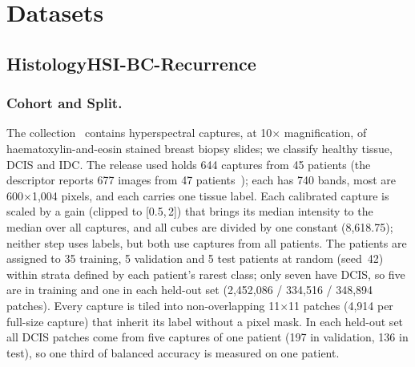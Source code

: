 \documentclass{svproc}
\begin{document}
\section{Datasets}\label{sec:data}
\subsection{HistologyHSI-BC-Recurrence}
\subsubsection{Cohort and Split.}
The collection~\cite{hsibc_data,hsibc_desc} contains hyperspectral captures, at 10$\times$ magnification, of haematoxylin-and-eosin stained breast biopsy slides; we classify healthy tissue, DCIS and IDC. The release used holds 644 captures from 45 patients (the descriptor reports 677 images from 47 patients~\cite{hsibc_desc}); each has 740 bands, most are 600$\times$1,004 pixels, and each carries one tissue label. Each calibrated capture is scaled by a gain (clipped to [0.5,\,2]) that brings its median intensity to the median over all captures, and all cubes are divided by one constant (8,618.75); neither step uses labels, but both use captures from all patients. The patients are assigned to 35 training, 5 validation and 5 test patients at random (seed~42) within strata defined by each patient's rarest class; only seven have DCIS, so five are in training and one in each held-out set (2,452,086 / 334,516 / 348,894 patches). Every capture is tiled into non-overlapping 11$\times$11 patches (4,914 per full-size capture) that inherit its label without a pixel mask. In each held-out set all DCIS patches come from five captures of one patient (197 in validation, 136 in test), so one third of balanced accuracy is measured on one patient.
\end{document}

